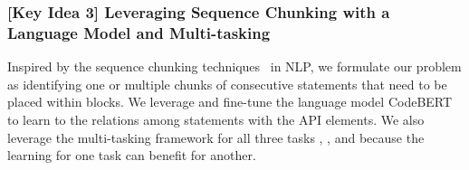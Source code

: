 \subsubsection{{\bf [Key Idea 3] Leveraging Sequence Chunking with a Language Model and Multi-tasking}} 
Inspired by the sequence chunking
techniques~\cite{sequence-chunking-aaai17} in NLP, we formulate our
problem as identifying one or multiple chunks of consecutive
statements that need to be placed within  blocks. We
leverage and fine-tune the language model
CodeBERT~\cite{codebert-emnlp20} to learn to the relations among
statements with the API elements.  We also leverage the multi-tasking
framework for all three tasks {\xblock}, {\xstate}, and {\xtype}
because the learning for one task can benefit for another.


